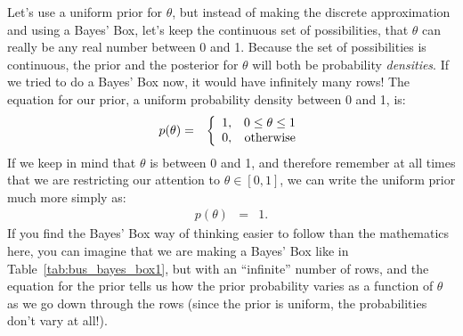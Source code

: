 Let's use a uniform prior for $\theta$, but instead of making the discrete
approximation and using a Bayes' Box, let's keep the continuous set of possibilities,
that $\theta$ can really be any real number between 0 and 1. Because the set of
possibilities is continuous, the prior and the posterior for $\theta$ will both
be probability {\it densities}. If we tried to do a Bayes' Box now, it would
have infinitely many rows!
The equation for our prior, a uniform probability density between 0 and 1, is:
\begin{eqnarray}
p(\theta) &=& \left\{
\begin{array}{lr}
1, & 0 \leq \theta \leq 1\\
0, & \textnormal{otherwise}
\end{array}
\right.\label{eq:uniform}
\end{eqnarray}
If we keep in mind that $\theta$ is between 0 and 1, and therefore remember at
all times that we are restricting our attention to $\theta \in [0, 1]$, we can
write the uniform prior much more simply as:
\begin{eqnarray}
p(\theta) &=& 1.
\end{eqnarray}
If you find the Bayes' Box way of thinking easier to follow than the mathematics
here, you can imagine that we are making a Bayes' Box like in
Table~\ref{tab:bus_bayes_box1}, but with an ``infinite'' number of rows, and
the equation for the prior tells us how the prior probability varies as a function
of $\theta$ as we go down through the rows (since the prior is uniform, the
probabilities don't vary at all!).


